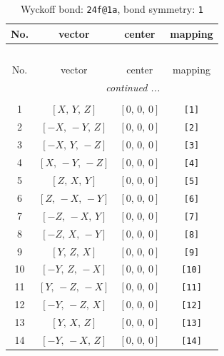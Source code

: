 \documentclass[fleqn,8pt]{jsarticle}
\begin{document}
\begin{longtable}{cccc}
\caption{Wyckoff bond: {\tt 24f@1a}, bond symmetry: {\tt 1}}
 \\
 \hline \hline
No. & vector & center & mapping \\ \hline \endfirsthead

\multicolumn{3}{l}{\tablename\ \thetable{}} \\
 \hline \hline
No. & vector & center & mapping \\ \hline \endhead

 \hline \hline
\multicolumn{3}{r}{\footnotesize\it continued ...} \\ \endfoot

 \hline \hline
\multicolumn{3}{r}{} \\ \endlastfoot

1 & $\left[ X,\, Y,\, Z \right]$ & $\left[ 0,\, 0,\, 0 \right]$ & {\tt [1]} \\ \hline
2 & $\left[ - X,\, - Y,\, Z \right]$ & $\left[ 0,\, 0,\, 0 \right]$ & {\tt [2]} \\ \hline
3 & $\left[ - X,\, Y,\, - Z \right]$ & $\left[ 0,\, 0,\, 0 \right]$ & {\tt [3]} \\ \hline
4 & $\left[ X,\, - Y,\, - Z \right]$ & $\left[ 0,\, 0,\, 0 \right]$ & {\tt [4]} \\ \hline
5 & $\left[ Z,\, X,\, Y \right]$ & $\left[ 0,\, 0,\, 0 \right]$ & {\tt [5]} \\ \hline
6 & $\left[ Z,\, - X,\, - Y \right]$ & $\left[ 0,\, 0,\, 0 \right]$ & {\tt [6]} \\ \hline
7 & $\left[ - Z,\, - X,\, Y \right]$ & $\left[ 0,\, 0,\, 0 \right]$ & {\tt [7]} \\ \hline
8 & $\left[ - Z,\, X,\, - Y \right]$ & $\left[ 0,\, 0,\, 0 \right]$ & {\tt [8]} \\ \hline
9 & $\left[ Y,\, Z,\, X \right]$ & $\left[ 0,\, 0,\, 0 \right]$ & {\tt [9]} \\ \hline
10 & $\left[ - Y,\, Z,\, - X \right]$ & $\left[ 0,\, 0,\, 0 \right]$ & {\tt [10]} \\ \hline
11 & $\left[ Y,\, - Z,\, - X \right]$ & $\left[ 0,\, 0,\, 0 \right]$ & {\tt [11]} \\ \hline
12 & $\left[ - Y,\, - Z,\, X \right]$ & $\left[ 0,\, 0,\, 0 \right]$ & {\tt [12]} \\ \hline
13 & $\left[ Y,\, X,\, Z \right]$ & $\left[ 0,\, 0,\, 0 \right]$ & {\tt [13]} \\ \hline
14 & $\left[ - Y,\, - X,\, Z \right]$ & $\left[ 0,\, 0,\, 0 \right]$ & {\tt [14]} \\ \hline

\end{longtable}
\end{document}
